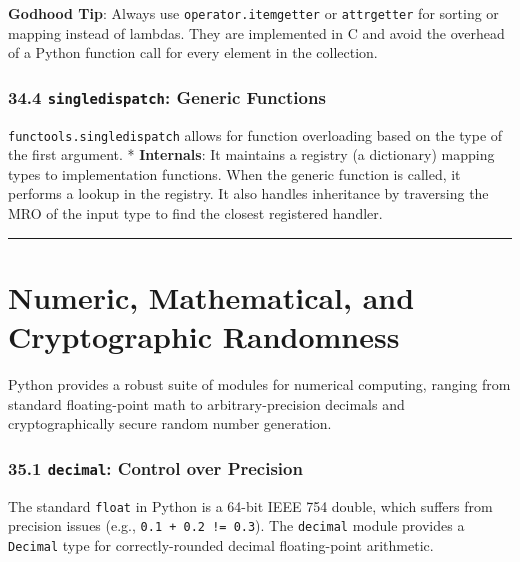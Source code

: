 \textbf{Godhood Tip}: Always use
\passthrough{\lstinline!operator.itemgetter!} or
\passthrough{\lstinline!attrgetter!} for sorting or mapping instead of
lambdas. They are implemented in C and avoid the overhead of a Python
function call for every element in the collection.

\hypertarget{singledispatch-generic-functions}{%
\subsection{\texorpdfstring{34.4 \texttt{singledispatch}: Generic
Functions}{34.4 singledispatch: Generic Functions}}\label{singledispatch-generic-functions}}

\passthrough{\lstinline!functools.singledispatch!} allows for function
overloading based on the type of the first argument. *
\textbf{Internals}: It maintains a registry (a dictionary) mapping types
to implementation functions. When the generic function is called, it
performs a lookup in the registry. It also handles inheritance by
traversing the MRO of the input type to find the closest registered
handler.

\begin{center}\rule{0.5\linewidth}{0.5pt}\end{center}

\hypertarget{numeric-mathematical-and-cryptographic-randomness}{%
\chapter{Numeric, Mathematical, and Cryptographic
Randomness}\label{numeric-mathematical-and-cryptographic-randomness}}

Python provides a robust suite of modules for numerical computing,
ranging from standard floating-point math to arbitrary-precision
decimals and cryptographically secure random number generation.

\hypertarget{decimal-control-over-precision}{%
\subsection{\texorpdfstring{35.1 \texttt{decimal}: Control over
Precision}{35.1 decimal: Control over Precision}}\label{decimal-control-over-precision}}

The standard \passthrough{\lstinline!float!} in Python is a 64-bit IEEE
754 double, which suffers from precision issues (e.g.,
\passthrough{\lstinline"0.1 + 0.2 != 0.3"}). The
\passthrough{\lstinline!decimal!} module provides a
\passthrough{\lstinline!Decimal!} type for correctly-rounded decimal
floating-point arithmetic.

